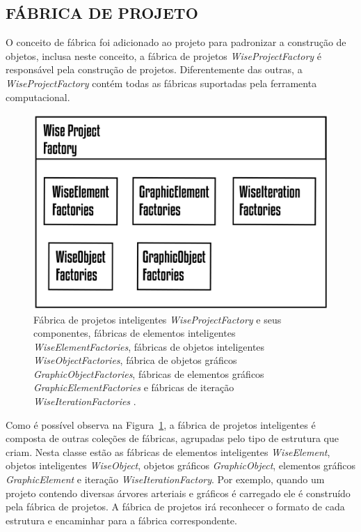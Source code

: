 \subsection{FÁBRICA DE PROJETO}\label{sec:fabrica_projeto} 

O conceito de fábrica foi adicionado ao projeto para padronizar a construção de objetos, inclusa neste conceito, a fábrica de projetos \textit{WiseProjectFactory} é responsável pela construção de projetos. Diferentemente das outras, a  \textit{WiseProjectFactory} contém todas as fábricas suportadas pela ferramenta computacional.

\begin{figure}[!htbp]
	\centering
	\includegraphics[scale=1.5]{Figures/WiseProjectFactory@16x.png}
	\caption{Fábrica de projetos inteligentes \textit{WiseProjectFactory} e seus componentes, fábricas de elementos inteligentes \textit{WiseElementFactories}, fábricas de objetos inteligentes \textit{WiseObjectFactories}, fábrica de objetos gráficos \textit{GraphicObjectFactories}, fábricas de elementos gráficos \textit{GraphicElementFactories} e fábricas de iteração \textit{WiseIterationFactories} .}
	\label{fig7:projectfactory}
\end{figure}

Como é possível observa na Figura~\ref{fig7:projectfactory}, a fábrica de projetos inteligentes é composta de outras coleções de fábricas, agrupadas pelo tipo de estrutura que criam. Nesta classe estão as fábricas de elementos inteligentes \textit{WiseElement}, objetos inteligentes \textit{WiseObject}, objetos gráficos \textit{GraphicObject}, elementos gráficos \textit{GraphicElement} e iteração \textit{WiseIterationFactory}. Por exemplo, quando um projeto contendo diversas árvores arteriais e gráficos é carregado ele é construído pela fábrica de projetos. A fábrica de projetos irá reconhecer o formato de cada estrutura e encaminhar para a fábrica correspondente.

